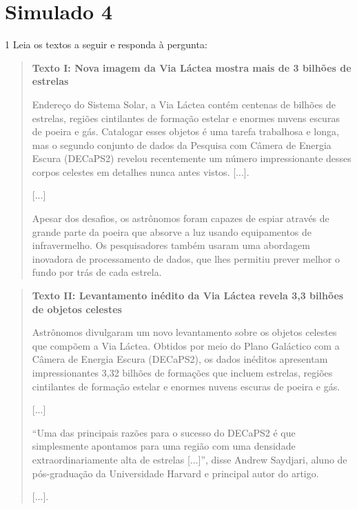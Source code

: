 \chapter{Simulado 4}

\num{1} Leia os textos a seguir e responda à pergunta:

\begin{quote}
\textbf{Texto I: Nova imagem da Via Láctea mostra mais de 3 bilhões de
estrelas}

Endereço do Sistema Solar, a Via Láctea contém centenas de bilhões de
estrelas, regiões cintilantes de formação estelar e enormes nuvens
escuras de poeira e gás. Catalogar esses objetos é uma tarefa trabalhosa
e longa, mas o segundo conjunto de dados da Pesquisa com Câmera de
Energia Escura (DECaPS2) revelou recentemente um número impressionante
desses corpos celestes em detalhes nunca antes vistos. {[}...{]}.

{[}...{]}

Apesar dos desafios, os astrônomos foram capazes de espiar através de
grande parte da poeira que absorve a luz usando equipamentos de
infravermelho. Os pesquisadores também usaram uma abordagem inovadora de
processamento de dados, que lhes permitiu prever melhor o fundo por trás
de cada estrela.

\end{quote}

\begin{quote}
\textbf{Texto II: Levantamento inédito da Via Láctea revela 3,3 bilhões
de objetos celestes}

Astrônomos divulgaram um novo levantamento sobre os objetos celestes
que compõem a Via Láctea. Obtidos por meio do Plano Galáctico com a
Câmera de Energia Escura (DECaPS2), os dados inéditos apresentam
impressionantes 3,32 bilhões de formações que incluem estrelas, regiões
cintilantes de formação estelar e enormes nuvens escuras de poeira e
gás.

{[}...{]}

``Uma das principais razões para o sucesso do DECaPS2 é que simplesmente
apontamos para uma região com uma densidade extraordinariamente alta de
estrelas {[}...{]}'', disse Andrew Saydjari, aluno de pós-graduação da
Universidade Harvard e principal autor do artigo.

{[}...{]}.

\end{quote}

